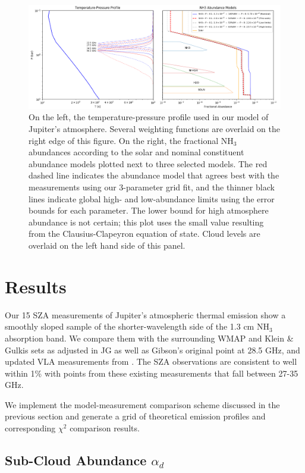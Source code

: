 \documentclass{article}
\begin{document}
	\begin{figure}
		\centering
		\includegraphics[width=\textwidth]{final_tp_const.png}
		\caption{\label{fig:tp}On the left, the temperature-pressure profile used in our model of Jupiter's atmosphere. Several weighting functions are overlaid on the right edge of this figure. On the right, the fractional NH$_{3}$ abundances according to the solar and nominal constituent abundance models plotted next to three selected models. The red dashed line indicates the abundance model that agrees best with the measurements using our 3-parameter grid fit, and the thinner black lines indicate global high- and low-abundance limits using the error bounds for each parameter. The lower bound for high atmosphere abundance is not certain; this plot uses the small value resulting from the Clausius-Clapeyron equation of state. Cloud levels are overlaid on the left hand side of this panel.}
	\end{figure}


\section{Results} \label{s:results}

	Our 15 SZA measurements of Jupiter's atmospheric thermal emission show a smoothly sloped sample of the shorter-wavelength side of the 1.3 cm NH$_{3}$ absorption band.
	We compare them with the surrounding WMAP and Klein \& Gulkis sets as adjusted in JG as well as Gibson's original point at 28.5 GHz, and updated VLA measurements from \citealt{2016Sci...352.1198D}.
	The SZA observations are consistent to well within 1\% with points from these existing measurements that fall between 27-35 GHz.

	We implement the model-measurement comparison scheme discussed in the previous section and generate a grid of theoretical emission profiles and corresponding $\chi^{2}$ comparison results.

\subsection{Sub-Cloud Abundance $\alpha_{d}$}
\end{document}
